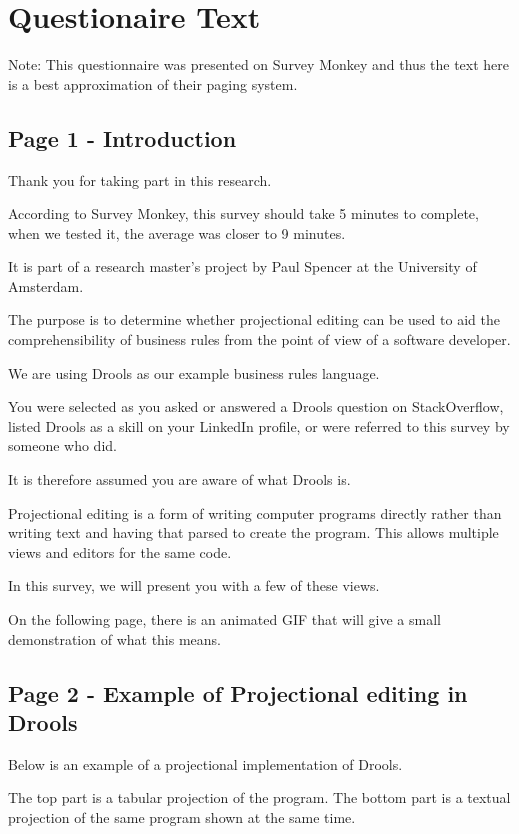 \chapter{Questionaire Text}\label{Appendix:Questionaire_text}

Note: This questionnaire was presented on Survey Monkey and thus the text here is a best approximation of their paging system.


\section{Page 1 - Introduction}

Thank you for taking part in this research.

According to Survey Monkey, this survey should take 5 minutes to complete, when we tested it, the average was closer to 9 minutes.

It is part of a research master's project by Paul Spencer at the University of Amsterdam.

The purpose is to determine whether projectional editing can be used to aid the comprehensibility of business rules from the point of view of a software developer.

We are using Drools as our example business rules language.

You were selected as you asked or answered a Drools question on StackOverflow, listed Drools as a skill on your LinkedIn profile, or were referred to this survey by someone who did.

It is therefore assumed you are aware of what Drools is.

Projectional editing is a form of writing computer programs directly rather than writing text and having that parsed to create the program.
This allows multiple views and editors for the same code.

In this survey, we will present you with a few of these views.

On the following page, there is an animated GIF that will give a small demonstration of what this means.

\section{Page 2 - Example of Projectional editing in Drools}

Below is an example of a projectional implementation of Drools.

The top part is a tabular projection of the program.
The bottom part is a textual projection of the same program shown at the same time.

